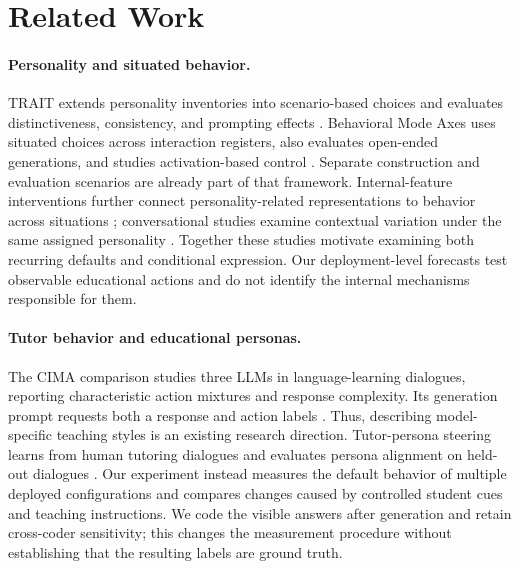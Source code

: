 \section{Related Work}

\paragraph{Personality and situated behavior.}
TRAIT extends personality inventories into scenario-based choices and evaluates
distinctiveness, consistency, and prompting effects \citep{lee2025trait}.
Behavioral Mode Axes uses situated choices across interaction registers,
also evaluates open-ended generations, and studies activation-based control
\citep{liu2026bma}. Separate construction and evaluation scenarios are already
part of that framework. Internal-feature interventions further connect
personality-related representations to behavior across situations
\citep{zhang2026triad}; conversational studies examine contextual variation under
the same assigned personality \citep{han2026contexts}. Together these studies
motivate examining both recurring defaults and conditional expression. Our
deployment-level forecasts test observable educational actions and do not
identify the internal mechanisms responsible for them.

\paragraph{Tutor behavior and educational personas.}
The CIMA comparison studies three LLMs in language-learning dialogues, reporting
characteristic action mixtures and response complexity. Its generation prompt
requests both a response and action labels \citep{kucheria2025cima}. Thus,
describing model-specific teaching styles is an existing research direction.
Tutor-persona steering learns from human tutoring dialogues and evaluates
persona alignment on held-out dialogues \citep{lee2026tutorpersonas}. Our
experiment instead measures the default behavior of multiple deployed
configurations and compares changes caused by controlled student cues and
teaching instructions. We code the visible answers after generation and retain
cross-coder sensitivity; this changes the measurement procedure without
establishing that the resulting labels are ground truth.


